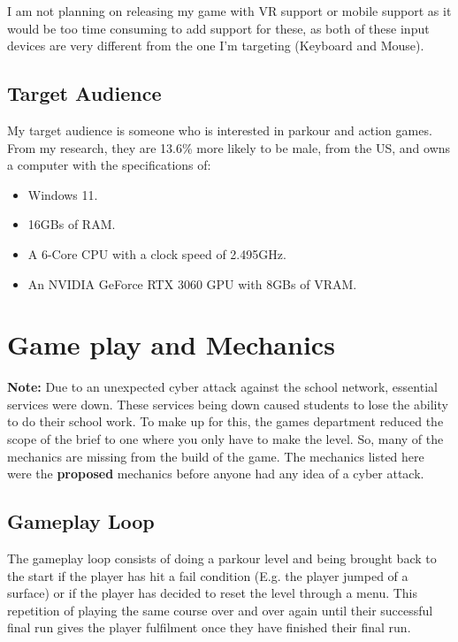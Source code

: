 \documentclass[12pt]{article}
\begin{document}
	I am not planning on releasing my game with VR support or mobile support as it would be too time consuming to add support for these, as both of these input devices are very different from the one I'm targeting (Keyboard and Mouse).
	
	\newpage
	\subsection{Target Audience}
	My target audience is someone who is interested in parkour and action games. From my research, they are 13.6\% more likely to be male, \cite{gameTreeIndustryReports} from the US, \cite{gameDiscoverCoCountryBreakdown} and owns a computer with the specifications of:
	\begin{itemize}
		\item Windows 11.
		\item 16GBs of RAM.
		\item A 6-Core CPU with a clock speed of 2.495GHz.
		\item An NVIDIA GeForce RTX 3060 GPU with 8GBs of VRAM.
	\end{itemize} \cite{steamHardwareSurvey}
	
	\section{Game play and Mechanics}
	\begin{note}
		\textbf{Note:} Due to an unexpected cyber attack against the school network, essential services were down. These services being down caused students to lose the ability to do their school work. To make up for this, the games department reduced the scope of the brief to one where you only have to make the level. So, many of the mechanics are missing from the build of the game. The mechanics listed here were the \textbf{proposed} mechanics before anyone had any idea of a cyber attack.
	\end{note}
	\subsection{Gameplay Loop}
	The gameplay loop consists of doing a parkour level and being brought back to the start if the player has hit a fail condition (E.g. the player jumped of a surface) or if the player has decided to reset the level through a menu. This repetition of playing the same course over and over again until their successful final run gives the player fulfilment once they have finished their final run.
	\newpage
\end{document}
